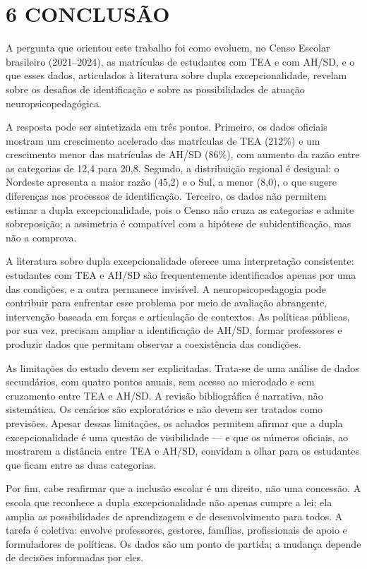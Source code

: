 \section{6 CONCLUSÃO}\label{conclusuxe3o}

A pergunta que orientou este trabalho foi como evoluem, no Censo Escolar
brasileiro (2021--2024), as matrículas de estudantes com TEA e com
AH/SD, e o que esses dados, articulados à literatura sobre dupla
excepcionalidade, revelam sobre os desafios de identificação e sobre as
possibilidades de atuação neuropsicopedagógica.

A resposta pode ser sintetizada em três pontos. Primeiro, os dados
oficiais mostram um crescimento acelerado das matrículas de TEA (212\%)
e um crescimento menor das matrículas de AH/SD (86\%), com aumento da
razão entre as categorias de 12,4 para 20,8. Segundo, a distribuição
regional é desigual: o Nordeste apresenta a maior razão (45,2) e o Sul,
a menor (8,0), o que sugere diferenças nos processos de identificação.
Terceiro, os dados não permitem estimar a dupla excepcionalidade, pois o
Censo não cruza as categorias e admite sobreposição; a assimetria é
compatível com a hipótese de subidentificação, mas não a comprova.

A literatura sobre dupla excepcionalidade oferece uma interpretação
consistente: estudantes com TEA e AH/SD são frequentemente identificados
apenas por uma das condições, e a outra permanece invisível. A
neuropsicopedagogia pode contribuir para enfrentar esse problema por
meio de avaliação abrangente, intervenção baseada em forças e
articulação de contextos. As políticas públicas, por sua vez, precisam
ampliar a identificação de AH/SD, formar professores e produzir dados
que permitam observar a coexistência das condições.

As limitações do estudo devem ser explicitadas. Trata-se de uma análise
de dados secundários, com quatro pontos anuais, sem acesso ao microdado
e sem cruzamento entre TEA e AH/SD. A revisão bibliográfica é narrativa,
não sistemática. Os cenários são exploratórios e não devem ser tratados
como previsões. Apesar dessas limitações, os achados permitem afirmar
que a dupla excepcionalidade é uma questão de visibilidade --- e que os
números oficiais, ao mostrarem a distância entre TEA e AH/SD, convidam a
olhar para os estudantes que ficam entre as duas categorias.

Por fim, cabe reafirmar que a inclusão escolar é um direito, não uma
concessão. A escola que reconhece a dupla excepcionalidade não apenas
cumpre a lei; ela amplia as possibilidades de aprendizagem e de
desenvolvimento para todos. A tarefa é coletiva: envolve professores,
gestores, famílias, profissionais de apoio e formuladores de políticas.
Os dados são um ponto de partida; a mudança depende de decisões
informadas por eles.

